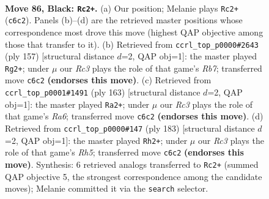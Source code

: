 \documentclass[11pt]{article}
\begin{document}
\clearpage

\begin{figure}[p]\centering
\begin{subfigure}{0.46\textwidth}\centering
\resizebox{\linewidth}{!}{%
\newchessgame
\chessboard[
  setfen={3R4/5k2/2r5/5p2/8/8/6K1/8 b - - 1 86},
  showmover=false,
  pgfstyle=straightmove, color=movearrow, markmove={c6-c2}
]}
\caption{}
\end{subfigure}\hfill
\begin{subfigure}{0.46\textwidth}\centering
\resizebox{\linewidth}{!}{%
\newchessgame
\chessboard[
  setfen={8/4k3/6K1/p7/7P/3R4/1r6/8 b - - 7 79},
  showmover=false,
  pgfstyle=straightmove, color=movearrow, markmove={b2-g2}
]}
\caption{}
\end{subfigure}
\\[4pt]
\begin{subfigure}{0.46\textwidth}\centering
\resizebox{\linewidth}{!}{%
\newchessgame
\chessboard[
  setfen={8/6k1/1R6/8/6P1/r7/6K1/8 b - - 4 82},
  showmover=false,
  pgfstyle=straightmove, color=movearrow, markmove={a3-a2}
]}
\caption{}
\end{subfigure}\hfill
\begin{subfigure}{0.46\textwidth}\centering
\resizebox{\linewidth}{!}{%
\newchessgame
\chessboard[
  setfen={1k6/8/8/8/7r/2R5/4K3/8 b - - 15 92},
  showmover=false,
  pgfstyle=straightmove, color=movearrow, markmove={h4-h2}
]}
\caption{}
\end{subfigure}
\caption{\textbf{Move 86, Black: \texttt{Rc2+}.} (a) Our position; Melanie plays \texttt{Rc2+} (\texttt{c6c2}). Panels (b)--(d) are the retrieved master positions whose correspondence most drove this move (highest QAP objective among those that transfer to it). (b) Retrieved from \texttt{ccrl\_top\_p0000\#2643} (ply 157) [structural distance $d$=2, QAP obj=1]: the master played \texttt{Rg2+}; under $\mu$ our \emph{Rc3} plays the role of that game's \emph{Rb7}; transferred move \texttt{c6c2} \textbf{(endorses this move)}. (c) Retrieved from \texttt{ccrl\_top\_p0001\#1491} (ply 163) [structural distance $d$=2, QAP obj=1]: the master played \texttt{Ra2+}; under $\mu$ our \emph{Rc3} plays the role of that game's \emph{Ra6}; transferred move \texttt{c6c2} \textbf{(endorses this move)}. (d) Retrieved from \texttt{ccrl\_top\_p0000\#147} (ply 183) [structural distance $d$=2, QAP obj=1]: the master played \texttt{Rh2+}; under $\mu$ our \emph{Rc3} plays the role of that game's \emph{Rh5}; transferred move \texttt{c6c2} \textbf{(endorses this move)}. Synthesis: 6 retrieved analogs transferred to \texttt{Rc2+} (summed QAP objective 5, the strongest correspondence among the candidate moves); Melanie committed it via the \texttt{search} selector.}
\label{fig:thought-m171}
\end{figure}
\end{document}
